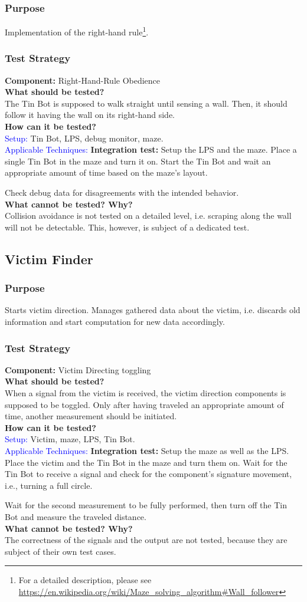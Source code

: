 \documentclass[a4paper,parskip,headheight=38pt]{scrartcl} %
\newcommand{\teststrat}[5]{
    \subsubsection{Test Strategy}
	\textbf{Component:} #1 \\
	\noindent\textbf{What should be tested?} \\
    \noindent #2 \\
	\noindent\textbf{How can it be tested?} \\
    \noindent\textcolor{blue}{Setup:} #3 \\
    \noindent\textcolor{blue}{Applicable Techniques:} #4 \\
	\noindent\textbf{What cannot be tested? Why?} \\
    \noindent #5
}
\newcommand{\ie}{i.e.}
\newcommand{\BLACK}{\textbf{Integration test: }}
\begin{document}
\subsubsection{Purpose}
Implementation of the right-hand rule\footnote{For a detailed description,
please see 
\url{https://en.wikipedia.org/wiki/Maze_solving_algorithm\#Wall_follower}
}.
\teststrat{Right-Hand-Rule Obedience}{
    The Tin Bot is supposed to walk straight until sensing a wall. Then, it
    should follow it having the wall on its right-hand side.
}{
    Tin Bot, LPS, debug monitor, maze.
}{
    \BLACK Setup the LPS and the maze. Place a single Tin Bot in the maze and
    turn it
    on. Start the Tin Bot and wait an appropriate amount of time based on the
    maze's layout.

    Check debug data for disagreements with the intended behavior.
}{
    Collision avoidance is not tested on a detailed level, i.e. scraping along
    the wall will not be detectable. This, however, is subject of a dedicated
    test.
}
%
\subsection{Victim Finder}
\subsubsection{Purpose}
Starts victim direction. Manages gathered data about the victim, i.e. discards
old information and start computation for new data accordingly.

\teststrat{Victim Directing toggling}{
    When a signal from the victim is received, the victim direction components
    is supposed to be toggled. Only after having traveled an appropriate amount
    of time, another measurement should be initiated.
}{
    Victim, maze, LPS, Tin Bot.
}{
    \BLACK Setup the maze as well as the LPS. Place the victim and the
    Tin Bot in the
    maze and turn them on. Wait for the Tin Bot to receive a signal and check
    for the component's signature movement, \ie, turning a full circle.

    Wait for the second measurement to be fully performed, then turn off the Tin
    Bot and measure the traveled distance.
}{
    The correctness of the signals and the output are not tested, because they
    are subject of their own test cases.
}
\end{document}

